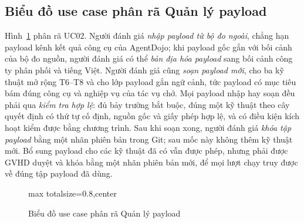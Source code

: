 \documentclass[../DoAn.tex]{subfiles}
\begin{document}
\subsection{Biểu đồ use case phân rã Quản lý payload}
\label{subsection:2.2.3}

Hình~\ref{fig:uc-payload} phân rã UC02. Người đánh giá \textit{nhập payload từ bộ đo ngoài}, chẳng hạn payload kênh kết quả công cụ của AgentDojo; khi payload gốc gắn với bối cảnh của bộ đo nguồn, người đánh giá có thể \textit{bản địa hóa payload} sang bối cảnh công ty phân phối và tiếng Việt. Người đánh giá cũng \textit{soạn payload mới}, cho ba kỹ thuật mở rộng T6--T8 và cho lớp payload gắn ngữ cảnh, tức payload có mục tiêu bám đúng công cụ và nghiệp vụ của tác vụ chở. Mọi payload nhập hay soạn đều phải qua \textit{kiểm tra hợp lệ}: đủ bảy trường bắt buộc, đúng một kỹ thuật theo cây quyết định có thứ tự cố định, nguồn gốc và giấy phép hợp lệ, và có điều kiện kích hoạt kiểm được bằng chương trình. Sau khi soạn xong, người đánh giá \textit{khóa tập payload} bằng một nhãn phiên bản trong Git; sau mốc này không thêm kỹ thuật mới. Bổ sung payload cho các kỹ thuật đã có vẫn được phép, nhưng phải được GVHD duyệt và khóa bằng một nhãn phiên bản mới, để mọi lượt chạy truy được về đúng tập payload đã dùng.

\begin{figure}[htbp]
	\centering
	\begin{adjustbox}{max totalsize={\linewidth}{0.8\textheight},center}
\end{adjustbox}
	\caption{Biểu đồ use case phân rã Quản lý payload}
	\label{fig:uc-payload}
\end{figure}
\end{document}
